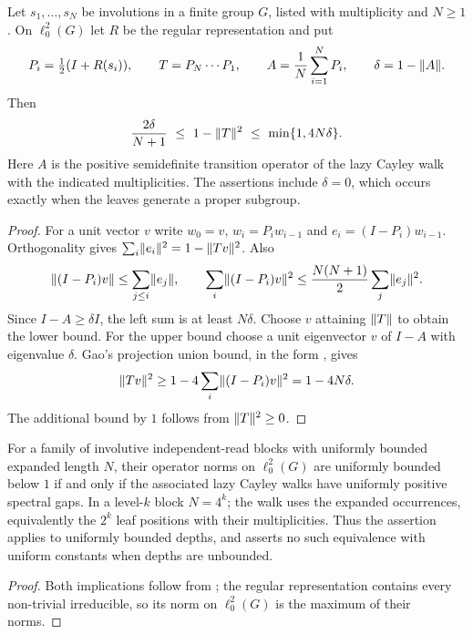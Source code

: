 \begin{proposition}
\label{prop:cayley-comparison}
Let $s_1,\ldots,s_N$ be involutions in a finite group $G$, listed with
multiplicity and $N\ge1$. On $\ell^2_0(G)$ let $R$ be the regular
representation and put
\[
P_i=\tfrac12(I+R(s_i)),\qquad T=P_N\cdots P_1,\qquad
A=\frac1N\sum_{i=1}^N P_i,\qquad \delta=1-\lVert A \rVert.
\]
Then
\[
\frac{2\delta}{N+1}\ \le\ 1-\opn T^2\ \le\ \min\{1,4N\delta\}.
\]
Here $A$ is the positive semidefinite transition operator of the lazy
Cayley walk with the indicated multiplicities. The assertions include
$\delta=0$, which occurs exactly when the leaves generate a proper subgroup.
\end{proposition}
\begin{proof}
For a unit vector $v$ write $w_0=v$, $w_i=P_iw_{i-1}$ and
$e_i=(I-P_i)w_{i-1}$. Orthogonality gives
$\sum_i\lVert e_i \rVert^2=1-\lVert Tv \rVert^2$. Also
\[
\lVert (I-P_i)v \rVert\le\sum_{j\le i}\lVert e_j \rVert,\qquad
\sum_i\lVert (I-P_i)v \rVert^2
\le\frac{N(N+1)}2\sum_j\lVert e_j \rVert^2.
\]
Since $I-A\ge\delta I$, the left sum is at least $N\delta$.
Choose $v$ attaining $\lVert T \rVert$ to obtain the lower bound.
For the upper bound choose a unit eigenvector $v$ of $I-A$ with
eigenvalue $\delta$. Gao's projection union bound, in the form
\cite[Lemma 2]{AnshuAradVidick2016}, gives
\[
\lVert Tv \rVert^2\ge1-4\sum_i\lVert (I-P_i)v \rVert^2=1-4N\delta.
\]
The additional bound by $1$ follows from $\lVert T \rVert^2\ge0$.
\end{proof}

\begin{corollary}
\label{cor:bounded-depth-gap}
For a family of involutive independent-read blocks with uniformly bounded
expanded length $N$, their operator norms on $\ell^2_0(G)$ are uniformly
bounded below $1$ if and only if the associated lazy Cayley walks have
uniformly positive spectral gaps. In a level-$k$ block $N=4^k$;
the walk uses the expanded occurrences, equivalently the $2^k$ leaf
positions with their multiplicities. Thus the assertion applies to
uniformly bounded depths, and asserts no such equivalence with uniform
constants when depths are unbounded.
\end{corollary}
\begin{proof}
Both implications follow from ; the regular
representation contains every non-trivial irreducible, so its norm on
$\ell^2_0(G)$ is the maximum of their norms.
\end{proof}
